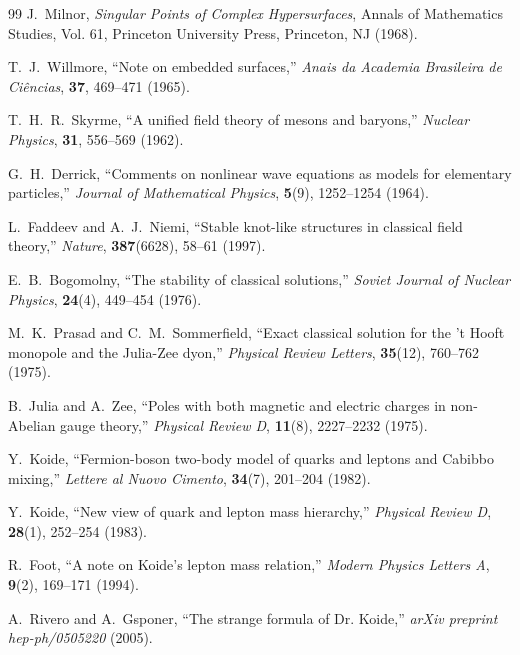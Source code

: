 \documentclass[12pt,a4paper]{article}
\begin{document}
\begin{thebibliography}{99}
			J.~Milnor, 
			\textit{Singular Points of Complex Hypersurfaces}, 
			Annals of Mathematics Studies, Vol. 61, Princeton University Press, Princeton, NJ (1968).
			
			T.~J.~Willmore, 
			``Note on embedded surfaces,''
			\textit{Anais da Academia Brasileira de Ci{\^e}ncias}, \textbf{37}, 469--471 (1965).
			
			T.~H.~R.~Skyrme, 
			``A unified field theory of mesons and baryons,''
			\textit{Nuclear Physics}, \textbf{31}, 556--569 (1962).
			
			G.~H.~Derrick, 
			``Comments on nonlinear wave equations as models for elementary particles,''
			\textit{Journal of Mathematical Physics}, \textbf{5}(9), 1252--1254 (1964).
			
			L.~Faddeev and A.~J.~Niemi, 
			``Stable knot-like structures in classical field theory,''
			\textit{Nature}, \textbf{387}(6628), 58--61 (1997).
			
			E.~B.~Bogomolny, 
			``The stability of classical solutions,''
			\textit{Soviet Journal of Nuclear Physics}, \textbf{24}(4), 449--454 (1976).
			
			M.~K.~Prasad and C.~M.~Sommerfield, 
			``Exact classical solution for the 't Hooft monopole and the Julia-Zee dyon,''
			\textit{Physical Review Letters}, \textbf{35}(12), 760--762 (1975).
			
			B.~Julia and A.~Zee, 
			``Poles with both magnetic and electric charges in non-Abelian gauge theory,''
			\textit{Physical Review D}, \textbf{11}(8), 2227--2232 (1975).
			
			Y.~Koide, 
			``Fermion-boson two-body model of quarks and leptons and Cabibbo mixing,''
			\textit{Lettere al Nuovo Cimento}, \textbf{34}(7), 201--204 (1982).
			
			Y.~Koide, 
			``New view of quark and lepton mass hierarchy,''
			\textit{Physical Review D}, \textbf{28}(1), 252--254 (1983).
			
			R.~Foot, 
			``A note on Koide's lepton mass relation,''
			\textit{Modern Physics Letters A}, \textbf{9}(2), 169--171 (1994).
			
			A.~Rivero and A.~Gsponer, 
			``The strange formula of Dr. Koide,''
			\textit{arXiv preprint hep-ph/0505220} (2005).
			

\end{thebibliography}
\end{document}
